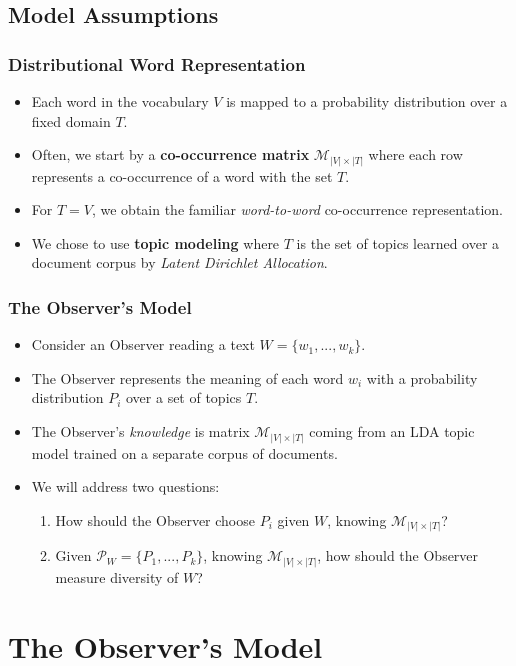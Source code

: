\documentclass{beamer}
\newcommand\cP{{\mathcal P}}
\newcommand\cM{{\mathcal M}}
\begin{document}
\subsection{Model Assumptions}

\begin{frame}
\frametitle{Distributional Word Representation}
\begin{itemize}
\item Each word in the vocabulary $V$ is mapped to a probability
  distribution over a fixed domain $T$.
\item Often, we start by a {\bf co-occurrence matrix} $\cM_{|V|\times|T|}$
  where each row represents a co-occurrence of a word with the set
  $T$. 
\item For $T=V$, we obtain the familiar {\em word-to-word}
  co-occurrence representation.
\item We chose to use {\bf topic modeling} where $T$ is the set of
  topics learned over a document corpus by {\em Latent Dirichlet
    Allocation}. 
\end{itemize}
\end{frame}

\begin{frame}
\frametitle{The Observer's Model}
\begin{itemize}
\item Consider an Observer reading a text $W=\{w_1,...,w_k\}$. 
\item The Observer represents the meaning of each word $w_i$ with a probability
  distribution $P_{i}$ over a set of topics $T$.
\item The Observer's {\em knowledge} is matrix $\cM_{|V|\times|T|}$ coming
  from an LDA topic model trained on a separate corpus of documents.
\item We will address two questions:
\begin{enumerate}
\item How should the Observer choose $P_{i}$ given $W$, knowing
  $\cM_{|V|\times|T|}$?
\item Given $\cP_{W}=\{P_{1},...,P_{k}\}$, knowing
  $\cM_{|V|\times|T|}$, how should the Observer measure diversity of $W$?
\end{enumerate}
\end{itemize}
\end{frame}

\section{The Observer's Model}
\end{document}
